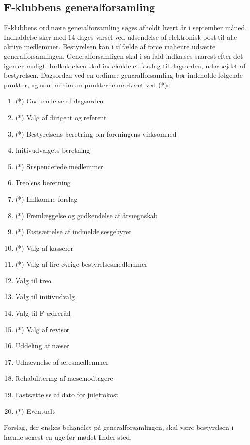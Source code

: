 \documentclass[a4paper,12pt,danish]{article}
\begin{document}
\begin{list}
\section{F-klubbens generalforsamling}

\item \label{par-gen} F-klubbens ordinære generalforsamling
  søges afholdt hvert år i september måned. Indkaldelse sker med 14
  dages varsel ved udsendelse af elektronisk post til alle aktive
  medlemmer. Bestyrelsen kan i tilfælde af force maheure udsætte 
  generalforsamlingen. Generalforsamligen skal i så fald indkalses 
  snarest efter det igen er muligt. Indkaldelsen skal indeholde et forslag til
  dagsorden, udarbejdet af bestyrelsen. Dagsorden ved en ordinær
  generalforsamling bør indeholde følgende punkter, og som minimum
punkterne markeret ved (*):

\begin{enumerate}
\item (*) Godkendelse af dagsorden
\item (*) Valg af dirigent og referent
\item (*) Bestyrelsens beretning om foreningens virksomhed
\item Initivudvalgets beretning
\item (*) Suspenderede medlemmer
\item Treo'ens beretning
\item (*) Indkomne forslag
\item (*) Fremlæggelse og godkendelse af årsregnskab
\item (*) Fastsættelse af indmeldelsesgebyret
\item (*) Valg af kasserer
\item (*) Valg af fire øvrige bestyrelsesmedlemmer
\item Valg til treo
\item Valg til initivudvalg
\item Valg til F-ædreråd
\item (*) Valg af revisor
\item Uddeling af næser
\item Udnævnelse af æresmedlemmer
\item Rehabilitering af næsemodtagere
\item Fastsættelse af dato for julefrokost
\item (*) Eventuelt
\end{enumerate}

Forslag, der ønskes behandlet på generalforsamlingen, skal
være bestyrelsen i hænde senest en uge før mødet finder
  sted.
  

\end{list}
\end{document}
